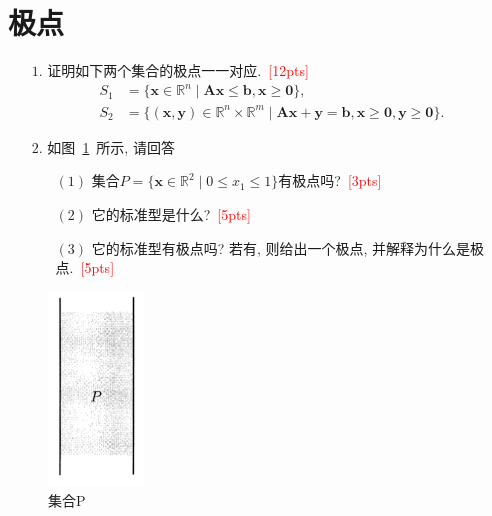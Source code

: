 \documentclass[10pt]{article}
\begin{document}
\section{极点}
\begin{itemize}
	\item[$1.$] 证明如下两个集合的极点一一对应.~\textcolor{red}{[12pts]}
	\begin{equation}\label{prob.Linf}
		\begin{aligned}
			S_1 &= \{\bm{x}\in\mathbb{R}^{n}\mid \bm{A}\bm{x}\leq\bm{b}, \bm{x}\geq\bm{0}\},\\
			S_2 &= \{(\bm{x},\bm{y})\in\mathbb{R}^{n}\times\mathbb{R}^{m}\mid \bm{A}\bm{x} + \bm{y} = \bm{b}, \bm{x}\geq\bm{0}, \bm{y}\geq\bm{0}\}.
		\end{aligned}
	\end{equation}

	\item[$2.$]
	如图~\ref{fig: linear program}~所示, 请回答
	\begin{itemize}
		\item[$(1)$] 集合$P = \{\bm{x}\in\mathbb{R}^{2}\mid 0\leq x_1\leq 1\}$有极点吗?~\textcolor{red}{[3pts]}
		
		\item[$(2)$] 它的标准型是什么?~\textcolor{red}{[5pts]}
		
		\item[$(3)$] 它的标准型有极点吗? 若有, 则给出一个极点, 并解释为什么是极点.~\textcolor{red}{[5pts]}
	\end{itemize}
\end{itemize}
\begin{figure}[htbp]
	\centering
	\includegraphics[width=1in]{lp.jpg}
	\caption{集合P}
	\label{fig: linear program}
\end{figure}
\end{document}
